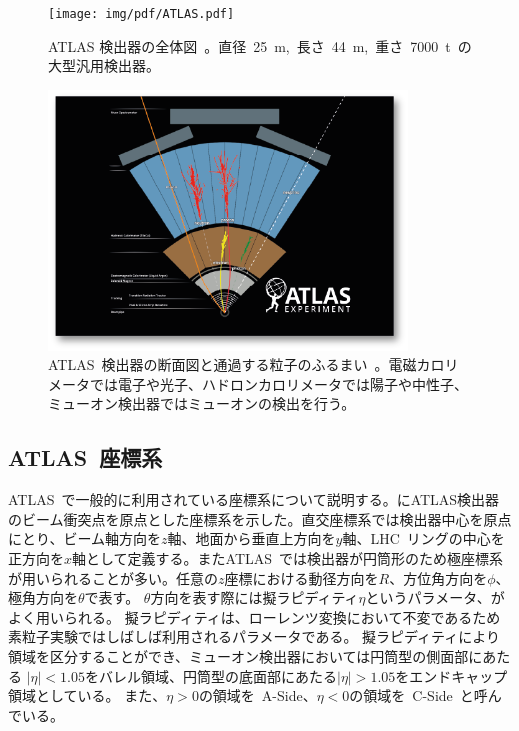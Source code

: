 \begin{figure}[tbp]
    \centering   
    \texttt{[image: img/pdf/ATLAS.pdf]}
    \caption[ATLAS 検出器の全体図]{ATLAS 検出器の全体図~\cite{TR:01}。直径~25~m,~長さ~44~m,~重さ~7000~t~の大型汎用検出器。}\label{fig:atlasdet}
\end{figure}

\begin{figure}[htbp]
    \centering   
    \includegraphics[width=0.85\textwidth]{img/jpeg/how.png}
    \caption[ATLAS~検出器の断面図と通過する粒子のふるまい]{ATLAS~検出器の断面図と通過する粒子のふるまい~\cite{URL:02}。電磁カロリメータでは電子や光子、ハドロンカロリメータでは陽子や中性子、ミューオン検出器ではミューオンの検出を行う。}
    \label{fig:disp}
\end{figure}

\subsection{ATLAS~座標系}
ATLAS~で一般的に利用されている座標系について説明する。にATLAS検出器のビーム衝突点を原点とした座標系を示した。直交座標系では検出器中心を原点にとり、ビーム軸方向を$z$軸、地面から垂直上方向を$y$軸、LHC~リングの中心を正方向を$x$軸として定義する。またATLAS~では検出器が円筒形のため極座標系が用いられることが多い。任意の$z$座標における動径方向を$R$、方位角方向を$\phi$、極角方向を$\theta$で表す。
$\theta$方向を表す際には擬ラピディティ$\eta$というパラメータ、がよく用いられる。
擬ラピディティは、ローレンツ変換において不変であるため素粒子実験ではしばしば利用されるパラメータである。
擬ラピディティにより領域を区分することができ、ミューオン検出器においては円筒型の側面部にあたる
$|\eta| < 1.05$をバレル領域、円筒型の底面部にあたる$|\eta| > 1.05$をエンドキャップ領域としている。
また、$\eta>0$の領域を~A-Side、$\eta<0$の領域を~C-Side~と呼んでいる。

